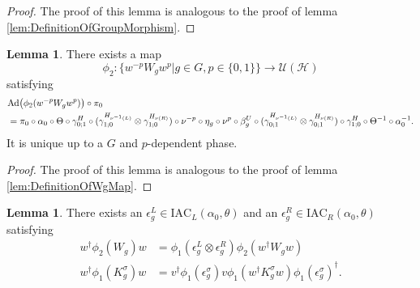 \documentclass[12pt,a4paper,twoside]{article}
\newcommand{\IAC}{\textrm{IAC}}
\let\originalleft\left
\let\originalright\right
\renewcommand{\left}{\mathopen{}\mathclose\bgroup\originalleft}
\renewcommand{\right}{\aftergroup\egroup\originalright}
\newcommand{\UU}{\mathcal U}
\newcommand{\HH}{\mathcal H}
\newcommand{\Ad}[1]{\textrm{Ad}\left(#1\right)}
\theoremstyle{definition}
\newtheorem{lemma}[theorem]{Lemma}
\numberwithin{equation}{section}
\begin{document}
\begin{proof}
	The proof of this lemma is analogous to the proof of lemma \ref{lem:DefinitionOfGroupMorphism}.
\end{proof}
\begin{lemma}\label{lem:DefinitionOfWgMapTwoTranslations}
	There exists a map
	\begin{equation}
		\phi_2:\{w^{-p}W_gw^p|g\in G,p\in\{0,1\}\}\rightarrow \UU(\HH)
	\end{equation}
	satisfying
	\begin{align}\label{eq:lemDefinitionOfWgMapConditionTwoTranslations}
		&\Ad{\phi_2(w^{-p}W_gw^p)}\circ\pi_0\\
		\nonumber
		&=\pi_0\circ \alpha_0\circ\Theta\circ\gamma^{H}_{0;1}\circ(\gamma^{H_{\nu^{-1}(L)}}_{1;0}\otimes\gamma^{H_{\nu(R)}}_{1;0})\circ\nu^{-p}\circ\eta_g\circ\nu^p\circ\beta_g^U\circ(\gamma^{H_{\nu^{-1}(L)}}_{0;1}\otimes\gamma^{H_{\nu(R)}}_{0;1})\circ\gamma^{H}_{1;0}\circ\Theta^{-1}\circ\alpha_0^{-1}.
	\end{align}
	It is unique up to a $G$ and $p$-dependent phase.
\end{lemma}
\begin{proof}
	The proof of this lemma is analogous to the proof of lemma \ref{lem:DefinitionOfWgMap}.
\end{proof}
\begin{lemma}
	There exists an $\epsilon^L_g\in\IAC_L(\alpha_0,\theta)$ and an $\epsilon^R_g\in\IAC_R(\alpha_0,\theta)$ satisfying
	\begin{align}
		w^\dagger \phi_2(W_g)w &= \phi_1(\epsilon_g^L\otimes\epsilon_g^R)\phi_2(w^\dagger W_g w)\\
		\label{eq:TransformationOfKUnderEpsilon}
		w^\dagger \phi_1(K_g^\sigma)w&=v^\dagger\phi_1(\epsilon_g^\sigma)v\phi_1(w^\dagger K_g^\sigma w)\phi_1(\epsilon_g^\sigma)^\dagger.
	\end{align}
\end{lemma}
\end{document}
